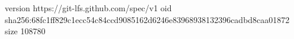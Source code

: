 version https://git-lfs.github.com/spec/v1
oid sha256:68fc1ff829c1ecc54c84ccd9085162d6246e83968938132396cadbd8caa01872
size 108780
